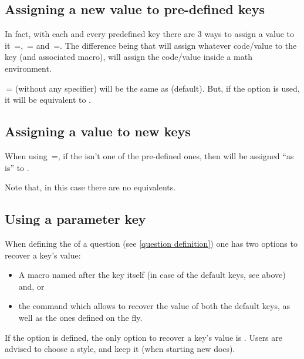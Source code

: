 \documentclass[10pt]{article}
\begin{document}
\subsection{Assigning a new value to pre-defined keys}
In fact, with each and every predefined key there are 3 ways to assign a value to it \,=, \,= and \,=. The difference being that  will assign whatever code/value to the key (and associated macro),  will assign the code/value inside a math environment. 
\begin{tsremark}
\,= (without any specifier) will be the same as  (default). But, if the option  is used, it will be equivalent to .
\end{tsremark}

\subsection{Assigning a value to new keys}
When using  \,=, if the  isn't one of the pre-defined ones, then  will be assigned ``as is'' to .
\begin{tsremark}
Note that, in this case there are no  equivalents. 
\end{tsremark}

\subsection{Using a parameter key}
When defining the  of a question (see \ref{question definition}) one has two options to recover a key's value:
\begin{itemize}
  \item A macro named after the key itself (in case of the default keys, see above) and, or
  \item the \tsobj{\QuestVal} command which allows to recover the value of both the default keys, as well as the ones defined on the fly.
\end{itemize}
\begin{tsremark}
If the option  is defined, the only option to recover a key's value is \tsobj{\QuestVal}. Users are advised to choose a style, and keep it (when starting new docs).
\end{tsremark}
\end{document}
